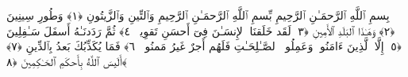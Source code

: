 
  
    
  
    
    

\nopagebreak
  بِسمِ ٱللَّهِ ٱلرَّحمَـٰنِ ٱلرَّحِيمِ
 بِّسمِ ٱللَّهِ ٱلرَّحمَـٰنِ ٱلرَّحِيمِ وَٱلتِّينِ وَٱلزَّيتُونِ ﴿١﴾
 وَطُورِ سِينِينَ ﴿٢﴾
 وَهَـٰذَا ٱلبَلَدِ ٱلأَمِينِ ﴿٣﴾
 لَقَد خَلَقنَا ٱلإِنسَـٰنَ فِىٓ أَحسَنِ تَقوِيمٍۢ ﴿٤﴾
 ثُمَّ رَدَدنَـٰهُ أَسفَلَ سَـٰفِلِينَ ﴿٥﴾
 إِلَّا ٱلَّذِينَ ءَامَنُوا۟ وَعَمِلُوا۟ ٱلصَّـٰلِحَـٰتِ فَلَهُم أَجرٌ غَيرُ مَمنُونٍۢ ﴿٦﴾
 فَمَا يُكَذِّبُكَ بَعدُ بِٱلدِّينِ ﴿٧﴾
 أَلَيسَ ٱللَّهُ بِأَحكَمِ ٱلحَـٰكِمِينَ ﴿٨﴾
 
